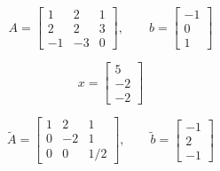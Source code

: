 \[
A=\left[
\begin{array}{ccc}
1 & 2 & 1 \\
2 & 2 & 3\\
-1 & -3 & 0
\end{array}\right],\quad \quad
b=\left[
\begin{array}{c}
  -1\\
   0 \\
   1
\end{array}\right]
\]
\medskip

\[
x=\left[
\begin{array}{c}
  5 \\
  -2 \\
  -2
\end{array}\right]
\]

\[
\tilde A=\left[
\begin{array}{ccc}
  1 & 2 & 1 \\
  0 & -2 & 1 \\
  0 & 0 & 1/2
\end{array}\right],\quad \quad \tilde b=\left[
\begin{array}{c}
  -1 \\
  2 \\
  -1
\end{array}\right]
\]

